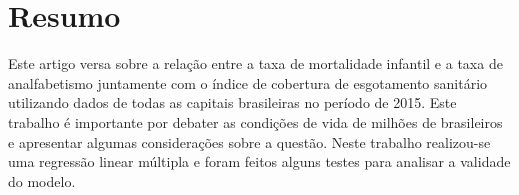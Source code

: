 \chapter{Resumo}
\label{cap:resumo}
Este artigo versa sobre a relação entre a taxa de mortalidade infantil e a taxa de analfabetismo juntamente com o índice de cobertura de esgotamento sanitário utilizando dados de todas as capitais brasileiras no período de 2015. Este trabalho é importante por debater as condições de vida de milhões de brasileiros e apresentar algumas considerações sobre a questão. Neste trabalho realizou-se uma regressão linear múltipla e foram feitos alguns testes para analisar a validade do modelo.
